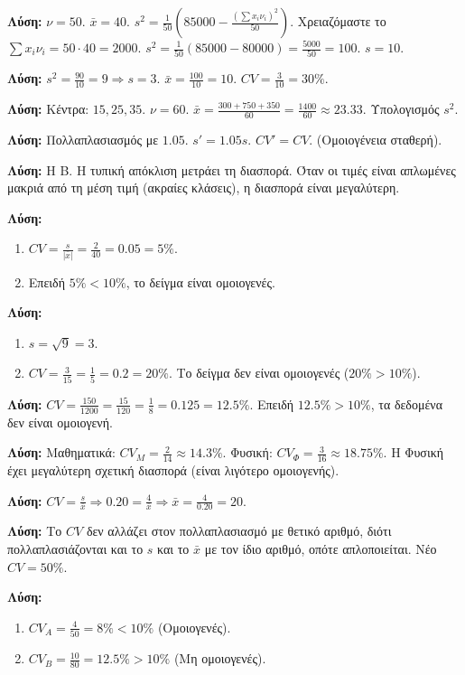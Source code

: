 \documentclass[11pt,a4paper,modern]{FFExercises}
\begin{document}
\askhsh
\textbf{Λύση:}
$\nu = 50$. $\bar{x} = 40$.
$s^2 = \frac{1}{50} (85000 - \frac{(\sum x_i \nu_i)^2}{50})$. Χρειαζόμαστε το $\sum x_i \nu_i = 50 \cdot 40 = 2000$.
$s^2 = \frac{1}{50} (85000 - 80000) = \frac{5000}{50} = 100$.
$s = 10$.

\askhsh
\textbf{Λύση:}
$s^2 = \frac{90}{10} = 9 \Rightarrow s=3$.
$\bar{x} = \frac{100}{10} = 10$.
$CV = \frac{3}{10} = 30\%$.

\askhsh
\textbf{Λύση:}
Κέντρα: $15, 25, 35$. $\nu=60$.
$\bar{x} = \frac{300 + 750 + 350}{60} = \frac{1400}{60} \approx 23.33$.
Υπολογισμός $s^2$.

\askhsh
\textbf{Λύση:}
Πολλαπλασιασμός με $1.05$.
$s' = 1.05 s$.
$CV' = CV$. (Ομοιογένεια σταθερή).

\askhsh
\textbf{Λύση:}
Η Β. Η τυπική απόκλιση μετράει τη διασπορά. Όταν οι τιμές είναι απλωμένες μακριά από τη μέση τιμή (ακραίες κλάσεις), η διασπορά είναι μεγαλύτερη.

\askhsh
\textbf{Λύση:}
\begin{enumerate}
    \item $CV = \frac{s}{|\bar{x}|} = \frac{2}{40} = 0.05 = 5\%$.
    \item Επειδή $5\% < 10\%$, το δείγμα είναι ομοιογενές.
\end{enumerate}

\askhsh
\textbf{Λύση:}
\begin{enumerate}
    \item $s = \sqrt{9} = 3$.
    \item $CV = \frac{3}{15} = \frac{1}{5} = 0.2 = 20\%$. Το δείγμα δεν είναι ομοιογενές ($20\% > 10\%$).
\end{enumerate}

\askhsh
\textbf{Λύση:}
$CV = \frac{150}{1200} = \frac{15}{120} = \frac{1}{8} = 0.125 = 12.5\%$.
Επειδή $12.5\% > 10\%$, τα δεδομένα δεν είναι ομοιογενή.

\askhsh
\textbf{Λύση:}
Μαθηματικά: $CV_M = \frac{2}{14} \approx 14.3\%$.
Φυσική: $CV_\Phi = \frac{3}{16} \approx 18.75\%$.
Η Φυσική έχει μεγαλύτερη σχετική διασπορά (είναι λιγότερο ομοιογενής).

\askhsh
\textbf{Λύση:}
$CV = \frac{s}{\bar{x}} \Rightarrow 0.20 = \frac{4}{\bar{x}} \Rightarrow \bar{x} = \frac{4}{0.20} = 20$.

\askhsh
\textbf{Λύση:}
Το $CV$ δεν αλλάζει στον πολλαπλασιασμό με θετικό αριθμό, διότι πολλαπλασιάζονται και το $s$ και το $\bar{x}$ με τον ίδιο αριθμό, οπότε απλοποιείται.
Νέο $CV = 50\%$.

\askhsh
\textbf{Λύση:}
\begin{enumerate}
    \item $CV_A = \frac{4}{50} = 8\% < 10\%$ (Ομοιογενές).
    \item $CV_B = \frac{10}{80} = 12.5\% > 10\%$ (Μη ομοιογενές).
\end{enumerate}
\end{document}
